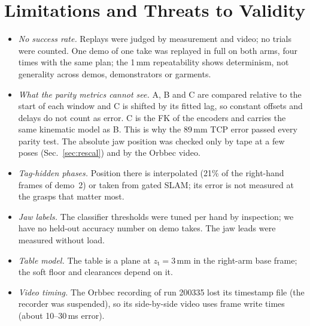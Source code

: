 \documentclass[conference,10pt]{IEEEtran}
\newcommand{\mm}{\,mm\xspace}
\begin{document}
\section{Limitations and Threats to Validity}\label{sec:limits}
\begin{itemize}
\item \emph{No success rate.} Replays were judged by measurement and video; no trials were counted. One demo of one take
  was replayed in full on both arms, four times with the same plan; the 1\mm repeatability shows determinism, not
  generality across demos, demonstrators or garments.
\item \emph{What the parity metrics cannot see.} A, B and C are compared relative to the start of each window and C is
  shifted by its fitted lag, so constant offsets and delays do not count as error. C is the FK of the encoders and carries
  the same kinematic model as B. This is why the 89\mm TCP error passed every parity test. The absolute jaw position was
  checked only by tape at a few poses (Sec.~\ref{sec:rescal}) and by the Orbbec video.
\item \emph{Tag-hidden phases.} Position there is interpolated (21\% of the right-hand frames of demo~2) or taken from
  gated SLAM; its error is not measured at the grasps that matter most.
\item \emph{Jaw labels.} The classifier thresholds were tuned per hand by inspection; we have no held-out accuracy number
  on demo takes. The jaw leads were measured without load.
\item \emph{Table model.} The table is a plane at $z_\mathrm{t}=3$\mm in the right-arm base frame; the soft floor and
  clearances depend on it.
\item \emph{Video timing.} The Orbbec recording of run 200335 lost its timestamp file (the recorder was suspended), so its
  side-by-side video uses frame write times (about 10--30\,ms error).
\end{itemize}

\end{document}
